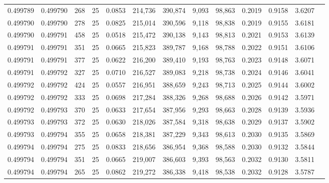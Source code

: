 \begin{tabular}{rrrrrrrrrrrrr}
0.499789 & 0.499790 &   268 &  25 &                                     0.0853 & 214,736 & 390,874 &   9,093 &  98,863 & 0.2019 & 0.9158 & 3.6207 \\
0.499790 & 0.499790 &   278 &  25 &                                     0.0825 & 215,014 & 390,596 &   9,118 &  98,838 & 0.2019 & 0.9155 & 3.6181 \\
0.499790 & 0.499791 &   458 &  25 &                                     0.0518 & 215,472 & 390,138 &   9,143 &  98,813 & 0.2021 & 0.9153 & 3.6139 \\
0.499791 & 0.499791 &   351 &  25 &                                     0.0665 & 215,823 & 389,787 &   9,168 &  98,788 & 0.2022 & 0.9151 & 3.6106 \\
0.499791 & 0.499791 &   377 &  25 &                                     0.0622 & 216,200 & 389,410 &   9,193 &  98,763 & 0.2023 & 0.9148 & 3.6071 \\
0.499791 & 0.499792 &   327 &  25 &                                     0.0710 & 216,527 & 389,083 &   9,218 &  98,738 & 0.2024 & 0.9146 & 3.6041 \\
0.499792 & 0.499792 &   424 &  25 &                                     0.0557 & 216,951 & 388,659 &   9,243 &  98,713 & 0.2025 & 0.9144 & 3.6002 \\
0.499792 & 0.499792 &   333 &  25 &                                     0.0698 & 217,284 & 388,326 &   9,268 &  98,688 & 0.2026 & 0.9142 & 3.5971 \\
0.499792 & 0.499793 &   370 &  25 &                                     0.0633 & 217,654 & 387,956 &   9,293 &  98,663 & 0.2028 & 0.9139 & 3.5936 \\
0.499793 & 0.499793 &   372 &  25 &                                     0.0630 & 218,026 & 387,584 &   9,318 &  98,638 & 0.2029 & 0.9137 & 3.5902 \\
0.499793 & 0.499794 &   355 &  25 &                                     0.0658 & 218,381 & 387,229 &   9,343 &  98,613 & 0.2030 & 0.9135 & 3.5869 \\
0.499794 & 0.499794 &   275 &  25 &                                     0.0833 & 218,656 & 386,954 &   9,368 &  98,588 & 0.2030 & 0.9132 & 3.5844 \\
0.499794 & 0.499794 &   351 &  25 &                                     0.0665 & 219,007 & 386,603 &   9,393 &  98,563 & 0.2032 & 0.9130 & 3.5811 \\
0.499794 & 0.499794 &   265 &  25 &                                     0.0862 & 219,272 & 386,338 &   9,418 &  98,538 & 0.2032 & 0.9128 & 3.5787 \\

\end{tabular}
